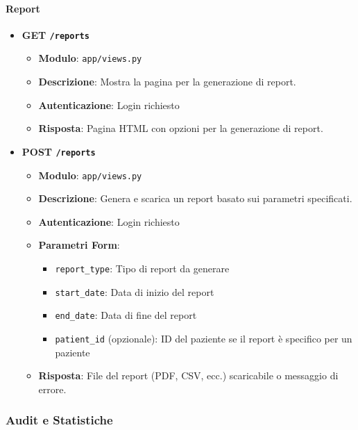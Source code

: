 \documentclass[12pt,a4paper,oneside]{report}
\begin{document}
\paragraph{Report}
\begin{itemize}
    \item \textbf{GET \texttt{/reports}}
          \begin{itemize}
              \item \textbf{Modulo}: \texttt{app/views.py}
              \item \textbf{Descrizione}: Mostra la pagina per la generazione di report.
              \item \textbf{Autenticazione}: Login richiesto
              \item \textbf{Risposta}: Pagina HTML con opzioni per la generazione di report.
          \end{itemize}

    \item \textbf{POST \texttt{/reports}}
          \begin{itemize}
              \item \textbf{Modulo}: \texttt{app/views.py}
              \item \textbf{Descrizione}: Genera e scarica un report basato sui parametri specificati.
              \item \textbf{Autenticazione}: Login richiesto
              \item \textbf{Parametri Form}:
                    \begin{itemize}
                        \item \texttt{report\_type}: Tipo di report da generare
                        \item \texttt{start\_date}: Data di inizio del report
                        \item \texttt{end\_date}: Data di fine del report
                        \item \texttt{patient\_id} (opzionale): ID del paziente se il report è specifico per un paziente
                    \end{itemize}
              \item \textbf{Risposta}: File del report (PDF, CSV, ecc.) scaricabile o messaggio di errore.
          \end{itemize}
\end{itemize}

\subsubsection{Audit e Statistiche}
\end{document}

